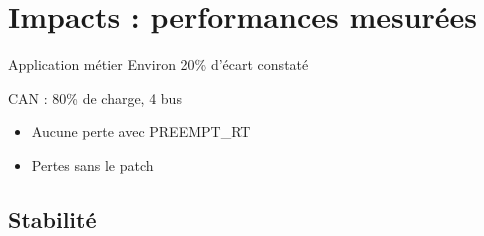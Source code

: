 \section{Impacts : performances mesurées}
\begin{frame}
	\begin{block}{Application métier}
		Environ 20\% d'écart constaté
	\end{block}
	\begin{block}{CAN : 80\% de charge, 4 bus}
		\begin{itemize}
			\item Aucune perte avec PREEMPT\_RT
			\item Pertes sans le patch
		\end{itemize}
	\end{block}
\end{frame}


\subsection{Stabilité}
\begin{frame}
	
\end{frame}

